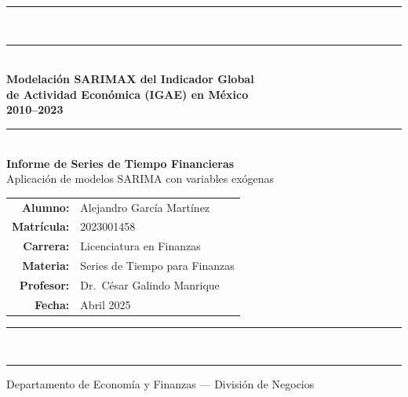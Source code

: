 \documentclass[12pt,a4paper]{article}
\begin{document}
\begin{titlepage}
  \pagecolor{grisclaro}
  \centering
  \vspace*{1.5cm}

  {\color{azuloscuro}\rule{\linewidth}{1.5pt}}\\[0.4cm]
  {\color{azuloscuro}\rule{\linewidth}{0.4pt}}\\[1.2cm]

  {\LARGE\bfseries\color{azuloscuro}
    Modelación SARIMAX del Indicador Global\\[0.3cm]
    de Actividad Económica (IGAE) en México\\[0.3cm]
    2010--2023
  }\\[1.0cm]

  {\color{azulmedio}\rule{0.6\linewidth}{0.8pt}}\\[1.0cm]

  {\large\bfseries\color{azuloscuro} Informe de Series de Tiempo Financieras}\\[0.3cm]
  {\normalsize\color{grisnota} Aplicación de modelos SARIMA con variables exógenas}\\[1.5cm]

  \begin{tabular}{rl}
    \textbf{Alumno:}   & Alejandro García Martínez \\[0.3em]
    \textbf{Matrícula:} & 2023001458 \\[0.3em]
    \textbf{Carrera:}   & Licenciatura en Finanzas \\[0.3em]
    \textbf{Materia:}   & Series de Tiempo para Finanzas \\[0.3em]
    \textbf{Profesor:}  & Dr.\ César Galindo Manrique \\[0.3em]
    \textbf{Fecha:}     & Abril 2025 \\
  \end{tabular}

  \vfill

  {\color{azuloscuro}\rule{\linewidth}{0.4pt}}\\[0.3cm]
  {\color{azuloscuro}\rule{\linewidth}{1.5pt}}

  \vspace{0.5cm}
  {\small\color{grisnota} Departamento de Economía y Finanzas — División de Negocios}
\end{titlepage}

\nopagecolor
\thispagestyle{empty}
\newpage
\end{document}
